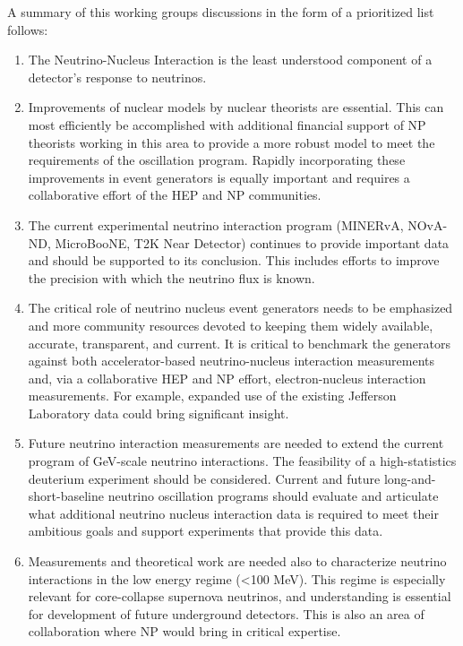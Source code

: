 A summary of this working groups discussions in the form of a
prioritized list follows:
\begin{enumerate}
\item The Neutrino-Nucleus Interaction is the least understood
  component of a detector’s response to neutrinos.

\item Improvements of nuclear models by nuclear theorists are
  essential. This can most efficiently be accomplished with additional
  financial support of NP theorists working in this area to provide a
  more robust model to meet the requirements of the oscillation
  program.  Rapidly incorporating these improvements in event
  generators is equally important and requires a collaborative effort
  of the HEP and NP communities.

\item The current experimental neutrino interaction program (MINERvA,
  NOvA-ND, MicroBooNE, T2K Near Detector) continues to provide
  important data and should be supported to its conclusion.  This
  includes efforts to improve the precision with which the neutrino
  flux is known.

\item The critical role of neutrino nucleus event generators needs to
  be emphasized and more community resources devoted to keeping them
  widely available, accurate, transparent, and current. It is critical
  to benchmark the generators against both accelerator-based
  neutrino-nucleus interaction measurements and, via a collaborative
  HEP and NP effort, electron-nucleus interaction measurements.  For
  example, expanded use of the existing Jefferson Laboratory data
  could bring significant insight.

\item Future neutrino interaction measurements are needed to extend
  the current program of GeV-scale neutrino interactions.  The
  feasibility of a high-statistics deuterium experiment should be
  considered.  Current and future long-and-short-baseline neutrino
  oscillation programs should evaluate and articulate what additional
  neutrino nucleus interaction data is required to meet their
  ambitious goals and support experiments that provide this data.

\item Measurements and theoretical work are needed also to
  characterize neutrino interactions in the low energy regime (<100
  MeV). This regime is especially relevant for core-collapse supernova
  neutrinos, and understanding is essential for development of future
  underground detectors.  This is also an area of collaboration where
  NP would bring in critical expertise.
\end{enumerate}

 
